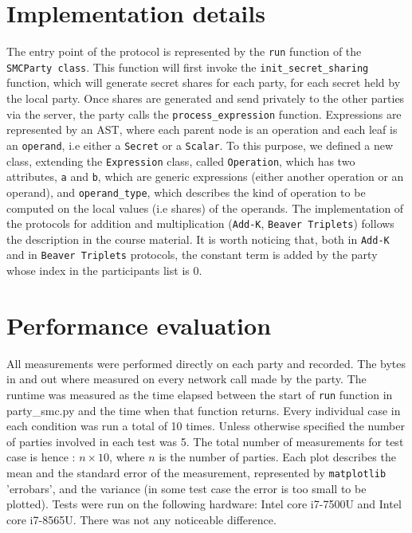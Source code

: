 \documentclass[10pt,conference,compsocconf]{IEEEtran}
\begin{document}
\section{Implementation details}
The entry point of the protocol is represented by the \texttt{run} function of the \texttt{SMCParty class}.
This function will first invoke the \texttt{init\_secret\_sharing} function, which will generate secret shares for each party, for each secret held by the local party.
Once shares are generated and send privately to the other parties via the server, the party calls the \texttt{process\_expression} function.
Expressions are represented by an AST, where each parent node is an operation and each leaf is an \texttt{operand}, i.e either a \texttt{Secret} or a \texttt{Scalar}.
To this purpose, we defined a new class, extending the \texttt{Expression} class, called \texttt{Operation}, which has two attributes, \texttt{a} and \texttt{b},
which are generic expressions (either another operation or an operand), and \texttt{operand\_type}, which describes the kind of operation to be computed on the local values (i.e shares)
of the operands.
The implementation of the protocols for addition and multiplication (\texttt{Add-K}, \texttt{Beaver Triplets}) follows the description in the course material. It is worth noticing that, both in \texttt{Add-K} and in \texttt{Beaver Triplets} protocols, the constant term is added by the party whose index in the participants list is $0$.
\section{Performance evaluation}
All measurements were performed directly on each party and recorded.
The bytes in and out where measured on every
network call made by the party.
The runtime was measured as the time elapsed between the start of \texttt{run} function in
party\_smc.py and the time when that function returns.
Every individual case in each condition was run a total of 10 times.
Unless otherwise specified the number of parties involved in each test was 5.
The total number of measurements for test case is hence : $n \times 10$, where $n$ is the number of parties.
Each plot describes the mean and the standard error of the measurement, represented by \texttt{matplotlib} 'errobars', and the variance (in some test case the error is too small to be plotted).
Tests were run on the following hardware: Intel core i7-7500U and Intel core i7-8565U. There was not any noticeable difference.
\end{document}
